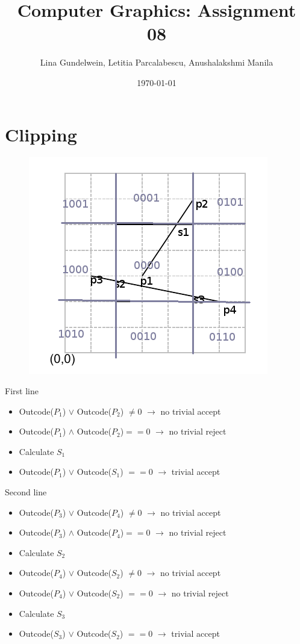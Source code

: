 \documentclass{article}
\title{Computer Graphics: Assignment 08} %
\author{Lina Gundelwein, Letitia Parcalabescu, Anushalakshmi Manila} %
\date{\today} %
\begin{document}
\maketitle 

\section{Clipping}
\begin{figure}[htb]
\includegraphics[scale=0.5]{01}
\end{figure}
First line
\begin{itemize}
\item Outcode($P_1$) $\vee$ Outcode($P_2$) $\neq 0$ $\rightarrow$ no trivial accept
\item Outcode($P_1$) $\wedge$ Outcode($P_2$)$ == 0$ $\rightarrow$ no trivial reject
\item Calculate $S_1$
\item Outcode($P_1$) $\vee$ Outcode($S_1$) $== 0$ $\rightarrow$ trivial accept
\end{itemize}
Second line
\begin{itemize}
\item Outcode($P_3$) $\vee$ Outcode($P_4$) $\neq 0$ $\rightarrow$ no trivial accept
\item Outcode($P_3$) $\wedge$ Outcode($P_4$)$ == 0$ $\rightarrow$ no trivial reject
\item Calculate $S_2$
\item Outcode($P_4$) $\vee$ Outcode($S_2$) $\neq 0$ $\rightarrow$ no trivial accept
\item Outcode($P_4$) $\vee$ Outcode($S_2$) $== 0$ $\rightarrow$ no trivial reject
\item Calculate $S_3$
\item Outcode($S_3$) $\vee$ Outcode($S_2$) $==0$ $\rightarrow$ trivial accept

\end{itemize}
\end{document}

